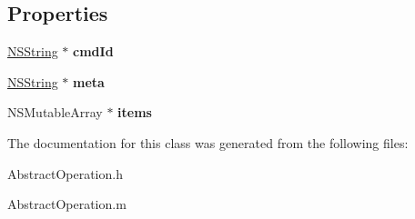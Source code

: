 \subsection*{\-Properties}
\begin{DoxyCompactItemize}
\item 
\hypertarget{interface_abstract_operation_a3955773058501927fa2a4debf969b0ff}{
\hyperlink{class_n_s_string}{\-N\-S\-String} $\ast$ {\bfseries cmd\-Id}}
\label{interface_abstract_operation_a3955773058501927fa2a4debf969b0ff}

\item 
\hypertarget{interface_abstract_operation_af793a90da11b1d69d26c6a84a4e8fc34}{
\hyperlink{class_n_s_string}{\-N\-S\-String} $\ast$ {\bfseries meta}}
\label{interface_abstract_operation_af793a90da11b1d69d26c6a84a4e8fc34}

\item 
\hypertarget{interface_abstract_operation_a7892f6d43f9daccd8b797eae45116197}{
\-N\-S\-Mutable\-Array $\ast$ {\bfseries items}}
\label{interface_abstract_operation_a7892f6d43f9daccd8b797eae45116197}

\end{DoxyCompactItemize}


\-The documentation for this class was generated from the following files\-:\begin{DoxyCompactItemize}
\item 
\-Abstract\-Operation.\-h\item 
\-Abstract\-Operation.\-m\end{DoxyCompactItemize}

